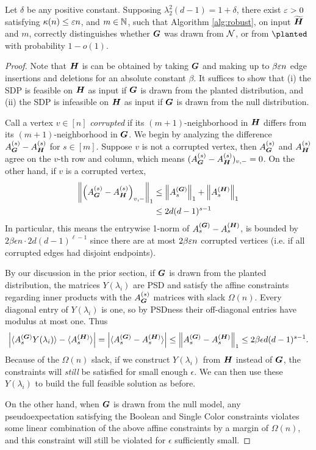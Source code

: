 \begin{theorem}
    Let $\delta$ be any positive constant. Supposing $\lambda^2_2(d-1) = 1+\delta$, there exist $\varepsilon > 0$ satisfying $\kappa(n)\le\varepsilon n$, and $m \in \mathbb{N}$, such that Algorithm \ref{alg:robust}, on input $\widetilde{\boldsymbol{H}}$ and $m$, correctly distinguishes whether $\boldsymbol{G}$ was drawn from $\mathcal{N}$, or from $\planted$ with probability $1-o(1)$.
\end{theorem}
\begin{proof}
	Note that $\boldsymbol{H}$ is can be obtained by taking $\boldsymbol{G}$ and making up to $\beta\varepsilon n$ edge insertions and deletions for an absolute constant $\beta$. It suffices to show that (i) the SDP is feasible on $\boldsymbol{H}$ as input if $\boldsymbol{G}$ is drawn from the planted distribution, and (ii) the SDP is infeasible on $\boldsymbol{H}$ as input if $\boldsymbol{G}$ is drawn from the null distribution.

	Call a vertex $v \in [n]$ \emph{corrupted} if its $(m+1)$-neighborhood in $\boldsymbol{H}$ differs from its $(m+1)$-neighborhood in $\boldsymbol{G}$.  We begin by analyzing the difference $A^{(s)}_{\boldsymbol{G}} -A^{(s)}_{\boldsymbol{H}}$ for $s\in[m]$. Suppose $v$ is not a corrupted vertex, then $A^{(s)}_{\boldsymbol{G}}$ and $A^{(s)}_{\boldsymbol{H}}$ agree on the $v$-th row and column, which means $(A^{(s)}_{\boldsymbol{G}}-A^{(s)}_{\boldsymbol{H}})_{v,-} = 0$. On the other hand, if $v$ is a corrupted vertex,
	\begin{align*}
		\left\|\left(A^{(s)}_{\boldsymbol{G}}-A^{(s)}_{\boldsymbol{H}}\right)_{v,-}\right\|_1 &\le \left\|A^{(\boldsymbol{G})}_{s}\right\|_1 + \left\|A^{(\boldsymbol{H})}_{s}\right\|_1\\
		&\le 2d(d-1)^{s-1}
	\end{align*}
	In particular, this means the entrywise 1-norm of $A^{(\boldsymbol{G})}_{s}-A^{(\boldsymbol{H})}_{s}$, is bounded by $2\beta\epsilon n\cdot 2d(d-1)^{\ell-1}$ since there are at most $2\beta\varepsilon n$ corrupted vertices (i.e. if all corrupted edges had disjoint endpoints).
	
	By our discussion in the prior section, if $\boldsymbol{G}$ is drawn from the planted distribution, the matrices $Y(\lambda_i)$ are PSD and satisfy the affine constraints regarding inner products with the $A^{(s)}_{\boldsymbol{G}}$ matrices with slack $\Omega(n)$. Every diagonal entry of $Y(\lambda_i)$ is one, so by PSDness their off-diagonal entries have modulus at most one. Thus
	$$
        \left|\langle A^{(\boldsymbol{G})}_{s} Y(\lambda_i) \rangle - \langle A^{(\boldsymbol{H})}_{s}\rangle \right| = \left|	\langle A^{(\boldsymbol{G})}_{s} - A^{(\boldsymbol{H})}_{s}\rangle\right| \le \left\|A^{(\boldsymbol{G})}_{s} - A^{(\boldsymbol{H})}_{s}\right\|_1 \le 2\beta\epsilon d(d-1)^{s-1}.
	$$
    Because of the $\Omega(n)$ slack, if we construct $Y(\lambda_i)$ from $\boldsymbol{H}$ instead of $\boldsymbol{G}$, the constraints will \emph{still} be satisfied for small enough $\epsilon$. We can then use these $Y(\lambda_i)$ to build the full feasible solution as before.
    
    On the other hand, when $\boldsymbol{G}$ is drawn from the null model, any pseudoexpectation satisfying the Boolean and Single Color constraints violates some linear combination of the above affine constraints by a margin of $\Omega(n)$, and this constraint will still be violated for $\epsilon$ sufficiently small.
    \end{proof}
